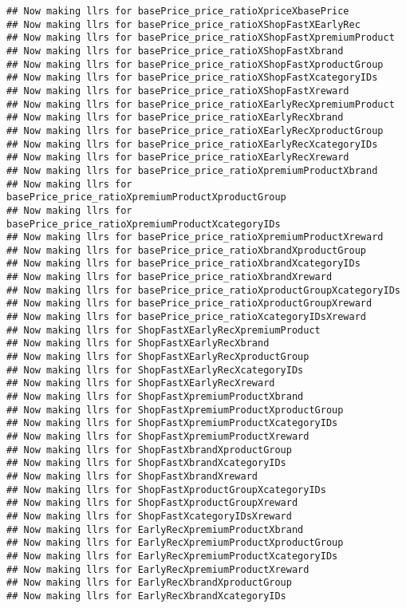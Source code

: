 \documentclass[10pt]{report}
\begin{document}
\begin{verbatim}
## Now making llrs for basePrice_price_ratioXpriceXbasePrice
## Now making llrs for basePrice_price_ratioXShopFastXEarlyRec
## Now making llrs for basePrice_price_ratioXShopFastXpremiumProduct
## Now making llrs for basePrice_price_ratioXShopFastXbrand
## Now making llrs for basePrice_price_ratioXShopFastXproductGroup
## Now making llrs for basePrice_price_ratioXShopFastXcategoryIDs
## Now making llrs for basePrice_price_ratioXShopFastXreward
## Now making llrs for basePrice_price_ratioXEarlyRecXpremiumProduct
## Now making llrs for basePrice_price_ratioXEarlyRecXbrand
## Now making llrs for basePrice_price_ratioXEarlyRecXproductGroup
## Now making llrs for basePrice_price_ratioXEarlyRecXcategoryIDs
## Now making llrs for basePrice_price_ratioXEarlyRecXreward
## Now making llrs for basePrice_price_ratioXpremiumProductXbrand
## Now making llrs for basePrice_price_ratioXpremiumProductXproductGroup
## Now making llrs for basePrice_price_ratioXpremiumProductXcategoryIDs
## Now making llrs for basePrice_price_ratioXpremiumProductXreward
## Now making llrs for basePrice_price_ratioXbrandXproductGroup
## Now making llrs for basePrice_price_ratioXbrandXcategoryIDs
## Now making llrs for basePrice_price_ratioXbrandXreward
## Now making llrs for basePrice_price_ratioXproductGroupXcategoryIDs
## Now making llrs for basePrice_price_ratioXproductGroupXreward
## Now making llrs for basePrice_price_ratioXcategoryIDsXreward
## Now making llrs for ShopFastXEarlyRecXpremiumProduct
## Now making llrs for ShopFastXEarlyRecXbrand
## Now making llrs for ShopFastXEarlyRecXproductGroup
## Now making llrs for ShopFastXEarlyRecXcategoryIDs
## Now making llrs for ShopFastXEarlyRecXreward
## Now making llrs for ShopFastXpremiumProductXbrand
## Now making llrs for ShopFastXpremiumProductXproductGroup
## Now making llrs for ShopFastXpremiumProductXcategoryIDs
## Now making llrs for ShopFastXpremiumProductXreward
## Now making llrs for ShopFastXbrandXproductGroup
## Now making llrs for ShopFastXbrandXcategoryIDs
## Now making llrs for ShopFastXbrandXreward
## Now making llrs for ShopFastXproductGroupXcategoryIDs
## Now making llrs for ShopFastXproductGroupXreward
## Now making llrs for ShopFastXcategoryIDsXreward
## Now making llrs for EarlyRecXpremiumProductXbrand
## Now making llrs for EarlyRecXpremiumProductXproductGroup
## Now making llrs for EarlyRecXpremiumProductXcategoryIDs
## Now making llrs for EarlyRecXpremiumProductXreward
## Now making llrs for EarlyRecXbrandXproductGroup
## Now making llrs for EarlyRecXbrandXcategoryIDs

\end{verbatim}
\end{document}
